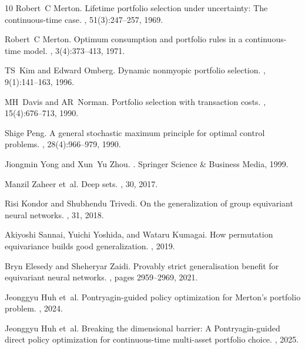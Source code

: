 \documentclass[11pt,a4paper]{article}
\theoremstyle{plain}
\theoremstyle{definition}
\theoremstyle{remark}
\begin{document}

\begin{thebibliography}{10}
Robert~C Merton.
\newblock Lifetime portfolio selection under uncertainty: The continuous-time case.
, 51(3):247--257, 1969.

Robert~C Merton.
\newblock Optimum consumption and portfolio rules in a continuous-time model.
, 3(4):373--413, 1971.

TS~Kim and Edward Omberg.
\newblock Dynamic nonmyopic portfolio selection.
, 9(1):141--163, 1996.

MH~Davis and AR~Norman.
\newblock Portfolio selection with transaction costs.
, 15(4):676--713, 1990.

Shige Peng.
\newblock A general stochastic maximum principle for optimal control problems.
, 28(4):966--979, 1990.

Jiongmin Yong and Xun~Yu Zhou.
.
\newblock Springer Science \& Business Media, 1999.

Manzil Zaheer et~al.
\newblock Deep sets.
, 30, 2017.

Risi Kondor and Shubhendu Trivedi.
\newblock On the generalization of group equivariant neural networks.
, 31, 2018.

Akiyoshi Sannai, Yuichi Yoshida, and Wataru Kumagai.
\newblock How permutation equivariance builds good generalization.
, 2019.

Bryn Elesedy and Sheheryar Zaidi.
\newblock Provably strict generalisation benefit for equivariant neural networks.
, pages 2959--2969, 2021.

Jeonggyu Huh et~al.
\newblock Pontryagin-guided policy optimization for Merton's portfolio problem.
, 2024.

Jeonggyu Huh et~al.
\newblock Breaking the dimensional barrier: A Pontryagin-guided direct policy optimization for continuous-time multi-asset portfolio choice.
, 2025.
\end{thebibliography}
\end{document}
